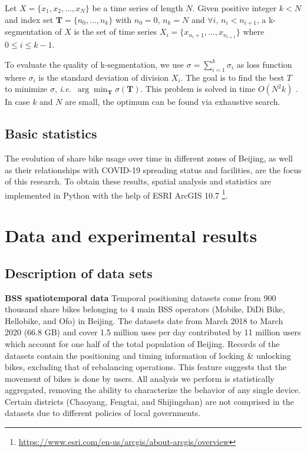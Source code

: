 \documentclass[ijgi,submit,moreauthors,pdftex]{Definitions/mdpi}
\begin{document}
\begin{Definition}[k-segmentation]\label{def:k-seg}
Let $X=\{x_1,x_2,\ldots,x_N\}$ be a time series of length $N$.
Given positive integer $k<N$ and index set $\mathbf{T}=\{n_0,\ldots,n_k\}$ with $n_0=0$, $n_k=N$ and $\forall i$, $n_i<n_{i+1}$, a k-segmentation of $X$ is the set of time series $X_i=\{x_{n_i+1},\ldots,x_{n_{i+1}}\}$ where $0\leq i\leq k-1$.
\end{Definition}

To evaluate the quality of k-segmentation, we use $\sigma=\sum_{i=1}^{k}{\sigma_i}$ as loss function where $\sigma_i$ is the standard deviation of division $X_i$. 
The goal is to find the best $T$ to minimize $\sigma$, \textit{i.e.}\ $\arg\min_{\mathbf{T}}\sigma(\mathbf{T})$.
This problem is solved in time $O(N^2k)$ \cite{terzi2006efficient}.
In case $k$ and $N$ are small, the optimum can be found via exhaustive search.

\subsection{Basic statistics}
The evolution of share bike usage over time in different zones of Beijing, as well as their relationships with COVID-19 spreading status and facilities, are the focus of this research.
To obtain these results, spatial analysis and statistics are implemented in Python with the help of ESRI ArcGIS 10.7 \footnote{\url{https://www.esri.com/en-us/arcgis/about-arcgis/overview}}. 

\section{Data and experimental results}
\subsection{Description of data sets}
\textbf{BSS spatiotemporal data} Temporal positioning datasets come from 900 thousand share bikes belonging to 4 main BSS operators (Mobike, DiDi Bike, Hellobike, and Ofo) in Beijing.
The datasets date from March 2018 to March 2020 (66.8 GB) and cover 1.5 million uses per day contributed by 11 million users which account for one half of the total population of Beijing.
Records of the datasets contain the positioning and timing information of locking \& unlocking bikes, excluding that of rebalancing operations.
This feature suggests that the movement of bikes is done by users.
All analysis we perform is statistically aggregated, removing the ability to characterize the behavior of any single device.
Certain districts (Chaoyang, Fengtai, and Shijingshan) are not comprised in the datasets due to different policies of local governments.
\end{document}

